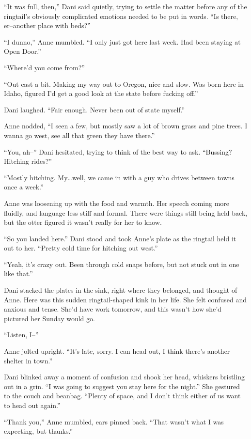 ``It was full, then,'' Dani said quietly, trying to settle the matter before any of the ringtail's obviously complicated emotions needed to be put in words. ``Is there, er--another place with beds?''

``I dunno,'' Anne mumbled. ``I only just got here last week. Had been staying at Open Door.''

``Where'd you come from?''

``Out east a bit. Making my way out to Oregon, nice and slow. Was born here in Idaho, figured I'd get a good look at the state before fucking off.''

Dani laughed. ``Fair enough. Never been out of state myself.''

Anne nodded, ``I seen a few, but mostly saw a lot of brown grass and pine trees. I wanna go west, see all that green they have there.''

``You, ah--'' Dani hesitated, trying to think of the best way to ask. ``Bussing? Hitching rides?''

``Mostly hitching. My\ldots{}well, we came in with a guy who drives between towns once a week.''

Anne was loosening up with the food and warmth. Her speech coming more fluidly, and language less stiff and formal. There were things still being held back, but the otter figured it wasn't really for her to know.

``So you landed here.'' Dani stood and took Anne's plate as the ringtail held it out to her. ``Pretty cold time for hitching out west.''

``Yeah, it's crazy out. Been through cold snaps before, but not stuck out in one like that.''

Dani stacked the plates in the sink, right where they belonged, and thought of Anne. Here was this sudden ringtail-shaped kink in her life. She felt confused and anxious and tense. She'd have work tomorrow, and this wasn't how she'd pictured her Sunday would go.

``Listen, I--''

Anne jolted upright. ``It's late, sorry. I can head out, I think there's another shelter in town.''

Dani blinked away a moment of confusion and shook her head, whiskers bristling out in a grin. ``I was going to suggest you stay here for the night.'' She gestured to the couch and beanbag. ``Plenty of space, and I don't think either of us want to head out again.''

``Thank you,'' Anne mumbled, ears pinned back. ``That wasn't what I was expecting, but thanks.''

